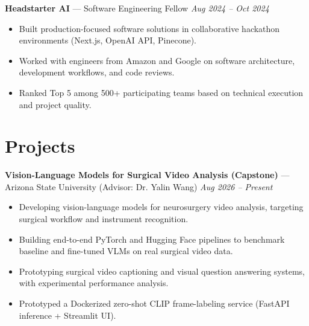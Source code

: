 \documentclass[a4paper,8pt]{extarticle}
\makeatletter
\newcommand{\v}[2]{%
  \edef\@vtmp{,\variant,}%
  \expandafter\in@\expandafter{\@vtmp}{,#1,}%
  \ifin@ #2\fi}
\makeatother
\begin{document}
\noindent
\textbf{Headstarter AI} --- Software Engineering Fellow
\hfill \textit{Aug 2024 -- Oct 2024}

\begin{itemize}
\item Built production-focused software solutions in collaborative hackathon environments\v{genai,swe}{ (Next.js, OpenAI API, Pinecone)}.
\item Worked with engineers from Amazon and Google on software architecture, development workflows, and code reviews.
\item Ranked Top 5 among 500+ participating teams based on technical execution and project quality.
\end{itemize}

\section*{Projects}

\noindent
\textbf{Vision-Language Models for Surgical Video Analysis (Capstone)} --- Arizona State University (Advisor: Dr. Yalin Wang)
\hfill \textit{Aug 2026 -- Present}

\begin{itemize}
\item Developing vision-language models for neurosurgery video analysis, targeting surgical workflow and instrument recognition.
\item Building end-to-end PyTorch and Hugging Face pipelines to benchmark baseline and fine-tuned VLMs on real surgical video data.
\item Prototyping surgical video captioning and visual question answering systems, with experimental performance analysis.
\v{genai,cv}{\item Prototyped a Dockerized zero-shot CLIP frame-labeling service (FastAPI inference + Streamlit UI).}
\end{itemize}
\end{document}
